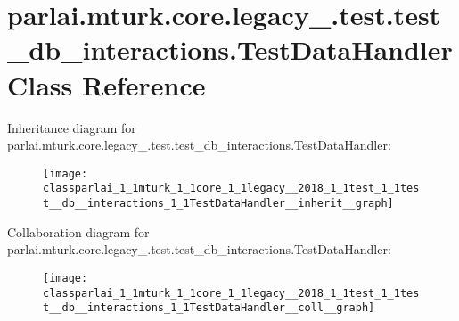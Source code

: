 \hypertarget{classparlai_1_1mturk_1_1core_1_1legacy__2018_1_1test_1_1test__db__interactions_1_1TestDataHandler}{}\section{parlai.\+mturk.\+core.\+legacy\+\_.\+test.\+test\+\_\+db\+\_\+interactions.\+Test\+Data\+Handler Class Reference}
\label{classparlai_1_1mturk_1_1core_1_1legacy__2018_1_1test_1_1test__db__interactions_1_1TestDataHandler}


Inheritance diagram for parlai.\+mturk.\+core.\+legacy\+\_.\+test.\+test\+\_\+db\+\_\+interactions.\+Test\+Data\+Handler\+:
\nopagebreak
\begin{figure}[H]
\begin{center}
\leavevmode
\texttt{[image: classparlai\_1\_1mturk\_1\_1core\_1\_1legacy\_\_2018\_1\_1test\_1\_1test\_\_db\_\_interactions\_1\_1TestDataHandler\_\_inherit\_\_graph]}
\end{center}
\end{figure}


Collaboration diagram for parlai.\+mturk.\+core.\+legacy\+\_.\+test.\+test\+\_\+db\+\_\+interactions.\+Test\+Data\+Handler\+:
\nopagebreak
\begin{figure}[H]
\begin{center}
\leavevmode
\texttt{[image: classparlai\_1\_1mturk\_1\_1core\_1\_1legacy\_\_2018\_1\_1test\_1\_1test\_\_db\_\_interactions\_1\_1TestDataHandler\_\_coll\_\_graph]}
\end{center}
\end{figure}
